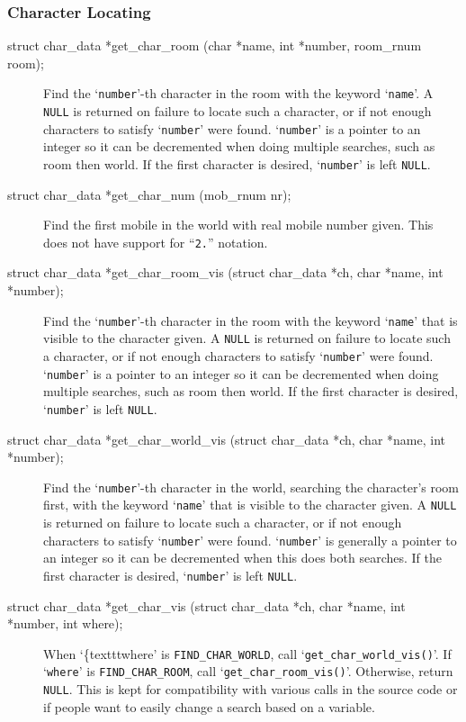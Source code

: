 \documentclass[11pt]{article}
\begin{document}
\subsubsection{Character Locating}
\begin{description}
\item[struct char\_data *get\_char\_room (char *name, int *number, room\_rnum room);]
Find the `\texttt{number}'-th character in the room with the keyword `\texttt{name}'. A \texttt{NULL} is returned on failure to locate such a character, or if not enough characters to satisfy `\texttt{number}' were found.  `\texttt{number}' is a pointer to an integer so it can be decremented when doing multiple searches, such as room then world. If the first character is desired, `\texttt{number}' is left \texttt{NULL}.
\item[struct char\_data *get\_char\_num (mob\_rnum nr);]
Find the first mobile in the world with real mobile number given.  This does not have support for ``\texttt{2.}'' notation.
\item[struct char\_data *get\_char\_room\_vis (struct char\_data *ch, char *name, int *number);]
Find the `\texttt{number}'-th character in the room with the keyword `\texttt{name}' that is visible to the character given. A \texttt{NULL} is returned on failure to locate such a character, or if not enough characters to satisfy `\texttt{number}' were found.  `\texttt{number}' is a pointer to an integer so it can be decremented when doing multiple searches, such as room then world. If the first character is desired, `\texttt{number}' is left \texttt{NULL}.
\item[struct char\_data *get\_char\_world\_vis (struct char\_data *ch, char *name, int *number);]
Find the `\texttt{number}'-th character in the world, searching the character's room first, with the keyword `\texttt{name}' that is visible to the character given. A \texttt{NULL} is returned on failure to locate such a character, or if not enough characters to satisfy `\texttt{number}' were
found.  `\texttt{number}' is generally a pointer to an integer so it can be
decremented when this does both searches. If the first character is
desired, `\texttt{number}' is left \texttt{NULL}.
\item[struct char\_data *get\_char\_vis (struct char\_data *ch, char *name, int *number, int where);]
When `\{texttt{where}' is \texttt{FIND\_CHAR\_WORLD}, call `\texttt{get\_char\_world\_vis()}'.  If `\texttt{where}' is \texttt{FIND\_CHAR\_ROOM}, call `\texttt{get\_char\_room\_vis()}'.  Otherwise, return \texttt{NULL}.  This is kept for compatibility with various calls in the source code or if people want to easily change a search based on a variable.

\end{description}
\end{document}
